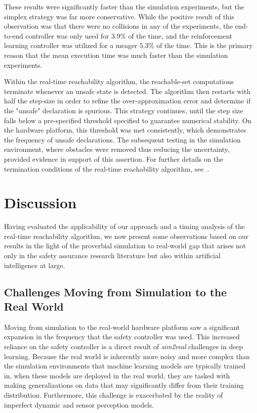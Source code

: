 \documentclass[manuscript,screen,review]{acmart}
\begin{document}
These results were significantly faster than the simulation experiments, but the simplex strategy was far more conservative. While the positive result of this observation was that there were no collisions in any of the experiments, the end-to-end controller was only used for $3.9\%$ of the time, and the reinforcement learning controller was utilized for a meager $5.3\%$ of the time. This is the primary reason that the mean execution time was much faster than the simulation experiments. 

Within the real-time reachability algorithm, the reachable-set computations terminate whenever an unsafe state is detected. The algorithm then restarts with half the step-size in order to refine the over-approximation error and determine if the "unsafe" declaration is spurious. This strategy continues, until the step size falls below a pre-specified threshold specified to guarantee numerical stability. On the hardware platform, this threshold was met consistently, which demonstrates the frequency of unsafe declarations. The subsequent testing in the simulation environment, where obstacles were removed thus reducing the uncertainty, provided evidence in support of this assertion. For further details on the termination conditions of the real-time reachability algorithm, see~\cite{Johnson2016}.







\section{Discussion}

Having evaluated the applicability of our approach and a timing analysis of the real-time reachability algorithm, we now present some observations based on our results in the light of the proverbial simulation to real-world gap that arises not only in the safety assurance research literature but also within artificial intelligence at large.

\subsection{Challenges Moving from Simulation to the Real World}

Moving from simulation to the real-world hardware platform saw a significant expansion in the frequency that the safety controller was used. This increased reliance on the safety controller is a direct result of \emph{sim2real} challenges in deep learning. Because the real world is inherently more noisy and more complex than the simulation environments that machine learning models are typically trained in, when these models are deployed in the real world, they are tasked with making generalizations on data that may significantly differ from their training distribution. Furthermore, this challenge is exacerbated by the reality of imperfect dynamic and sensor perception models\cite{ivanov2020case}.
\end{document}
